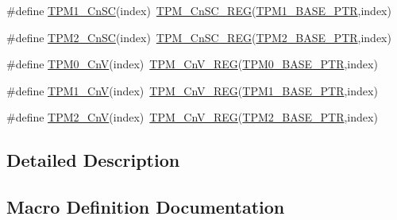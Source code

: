 \begin{DoxyCompactItemize}
\item 
\#define \hyperlink{group___t_p_m___register___accessor___macros_ga8e3ae6bd927b01c0448904eae9978681}{T\+P\+M1\+\_\+\+Cn\+SC}(index)~\hyperlink{group___t_p_m___register___accessor___macros_gaa96e657221c499960f64bc004e348b6c}{T\+P\+M\+\_\+\+Cn\+S\+C\+\_\+\+R\+EG}(\hyperlink{group___t_p_m___peripheral_ga3c3f533f8c87c74f2bbc3a4de83d1181}{T\+P\+M1\+\_\+\+B\+A\+S\+E\+\_\+\+P\+TR},index)
\item 
\#define \hyperlink{group___t_p_m___register___accessor___macros_ga38916e72b8c47d4bb613b67e84ae2c58}{T\+P\+M2\+\_\+\+Cn\+SC}(index)~\hyperlink{group___t_p_m___register___accessor___macros_gaa96e657221c499960f64bc004e348b6c}{T\+P\+M\+\_\+\+Cn\+S\+C\+\_\+\+R\+EG}(\hyperlink{group___t_p_m___peripheral_ga37cc120e7475fb646fe9bc15b57f06bc}{T\+P\+M2\+\_\+\+B\+A\+S\+E\+\_\+\+P\+TR},index)
\item 
\#define \hyperlink{group___t_p_m___register___accessor___macros_ga6d7fece02449611437af86de47ff98c8}{T\+P\+M0\+\_\+\+CnV}(index)~\hyperlink{group___t_p_m___register___accessor___macros_gaf87163e32c337d1f46724110a85e8ea2}{T\+P\+M\+\_\+\+Cn\+V\+\_\+\+R\+EG}(\hyperlink{group___t_p_m___peripheral_ga8ba6c6fb69345639750108c3289a24c4}{T\+P\+M0\+\_\+\+B\+A\+S\+E\+\_\+\+P\+TR},index)
\item 
\#define \hyperlink{group___t_p_m___register___accessor___macros_ga490064e6537a9cfd2c7d6e3603360721}{T\+P\+M1\+\_\+\+CnV}(index)~\hyperlink{group___t_p_m___register___accessor___macros_gaf87163e32c337d1f46724110a85e8ea2}{T\+P\+M\+\_\+\+Cn\+V\+\_\+\+R\+EG}(\hyperlink{group___t_p_m___peripheral_ga3c3f533f8c87c74f2bbc3a4de83d1181}{T\+P\+M1\+\_\+\+B\+A\+S\+E\+\_\+\+P\+TR},index)
\item 
\#define \hyperlink{group___t_p_m___register___accessor___macros_ga15826b335965333d95d30f9859750851}{T\+P\+M2\+\_\+\+CnV}(index)~\hyperlink{group___t_p_m___register___accessor___macros_gaf87163e32c337d1f46724110a85e8ea2}{T\+P\+M\+\_\+\+Cn\+V\+\_\+\+R\+EG}(\hyperlink{group___t_p_m___peripheral_ga37cc120e7475fb646fe9bc15b57f06bc}{T\+P\+M2\+\_\+\+B\+A\+S\+E\+\_\+\+P\+TR},index)
\end{DoxyCompactItemize}


\subsection{Detailed Description}


\subsection{Macro Definition Documentation}
\mbox{\label{group___t_p_m___register___accessor___macros_gace041d2188ed4171f06ad0b573d17a16}} 
